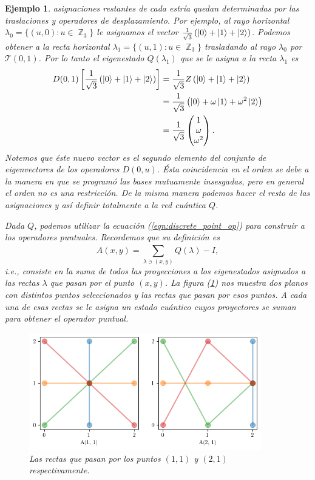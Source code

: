 \documentclass[a4paper]{report}
\DeclareMathOperator{\Z}{\mathbb{Z}}
\newtheorem{example}{Ejemplo}
\begin{document}
\begin{example}
    asignaciones restantes de cada estría quedan
    determinadas por las traslaciones y operadores de
    desplazamiento. Por ejemplo, al rayo horizontal
    $\lambda_0 = \{(u,0) : u \in \Z_3\}$ le asignamos el
    vector $\frac{1}{\sqrt{3}} \left( \ket 0 + \ket 1 + \ket
    2 \right)$. Podemos obtener a la recta horizontal
    $\lambda_1 = \{(u,1) : u \in \Z_3\}$ trasladando al
    rayo $\lambda_0$ por $\mathcal T(0,1)$. Por lo tanto el
    eigenestado $Q(\lambda_1)$ que se le asigna a la recta
    $\lambda_1$ es
    \begin{align}
      D(0,1) \left[ \frac{1}{\sqrt{3}} \left( \ket 0 + \ket
      1 + \ket 2\right) \right]
      &= \frac{1}{\sqrt{3}} Z \left( \ket 0 + \ket 1 + \ket
      2\right) \\
      &= \frac{1}{\sqrt{3}} \left( \ket 0 + \omega
      \ket 1 + \omega^2 \ket 2\right) \\
      &= \frac{1}{\sqrt{3}} \begin{pmatrix} 1 \\ \omega \\
      \omega^2 \end{pmatrix}.
    \end{align}
    Notemos que éste nuevo vector es el segundo elemento del
    conjunto de eigenvectores de los operadores $D(0,u)$.
    Ésta coincidencia en el orden se debe a la manera en que
    se programó las bases mutuamente insesgadas, pero en
    general el orden no es una restricción. De la misma
    manera podemos hacer el resto de las asignaciones y así
    definir totalmente a la red cuántica $Q$.

    Dada $Q$, podemos utilizar la ecuación
    (\ref{eqn:discrete_point_op}) para construir a los
    operadores puntuales. Recordemos que su definición es
    \[
      A(x,y) = \sum_{\lambda \ni (x,y)}^{} Q(\lambda) - I,
    \] 
    i.e., consiste en la suma de todos las proyecciones a
    los eigenestados asignados a las rectas $\lambda$ que
    pasan por el punto $(x,y)$. La figura
    (\ref{fig:point-lines-3-1}) nos muestra dos planos con
    distintos puntos seleccionados y las rectas que pasan
    por esos puntos. A cada una de esas rectas se le asigna
    un estado cuántico cuyos proyectores se suman para
    obtener el operador puntual. 
    \begin{figure}[ht]
      \centering
      \includegraphics[width=0.9\textwidth]{imgs/As-3-1.png}
      \caption{Las rectas que pasan por los puntos $(1,1)$ y
      $(2,1)$ respectivamente.}
      \label{fig:point-lines-3-1}
    \end{figure}


\end{example}
\end{document}
